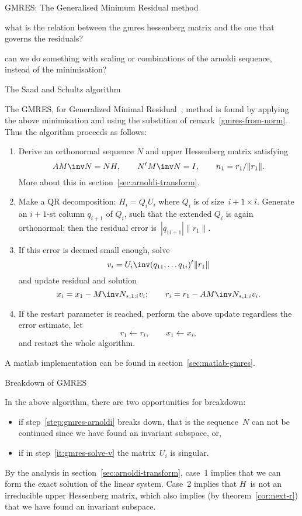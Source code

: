 \documentclass[11pt]{artikel3}
\begin{document}
\begin{Outline}

 {GMRES: The Generalised Minimum Residual method}
\label{sec:gmres}

\begin{question}
what is the relation between the gmres hessenberg matrix and the one
that governs the residuals?
\end{question}
\begin{question}
can we do something with scaling or combinations of the arnoldi
sequence, instead of the minimisation?
\end{question}

 {The Saad and Schultz algorithm}

The GMRES, for Generalized Minimal Residual~\cite{SaadSchultz:gmres}, method
is found by applying the above minimisation and using the
substition of remark~\ref{gmres-from-norm}.
Thus the algorithm proceeds as follows:
\begin{enumerate}
\item\label{step:gmres-arnoldi}
 Derive an orthonormal sequence $N$ and upper Hessenberg matrix satisfying
\[ AM\inv N=NH,\qquad N^tM\inv N=I,\qquad n_1=r_1/\|r_1\|. \]
More about this in section~\ref{sec:arnoldi-transform}.
\item\label{it:gmres-error}
Make a QR decomposition: $H_i=Q_iU_i$ where $Q_i$ is 
of size~\hbox{$i+1\times i$}.
Generate an $i+1$-st column $q_{i+1}$ of $Q_i$, such that
the extended $Q_i$ is again orthonormal;
then the residual error is~$|q_{1i+1}|\|r_1\|$.
\item\label{it:gmres-solve-v} If this error is deemed small enough, solve
\[ v_i=U_i\inv (q_{11},\ldots q_{1i})^t \|r_1\| \]
and update residual and solution
\[ x_i=x_1-M\inv N_{*,1:i}v_i; \qquad r_i=r_1-AM\inv N_{*,1:i}v_i. \]
\item If the restart parameter is reached, perform the above update
regardless the error estimate, let
\[ r_1\leftarrow r_i,\qquad x_1\leftarrow x_i, \]
and restart the whole algorithm.
\end{enumerate}

A matlab implementation can be found in section~\ref{sec:matlab-gmres}.

 {Breakdown of GMRES}\label{sec:gmres-breakdown}

In the above algorithm, there are two opportunities for breakdown:
\begin{itemize}\item if step~\ref{step:gmres-arnoldi}
breaks down, that is the sequence~$N$ can not be continued since we
have found an invariant subspace, or,
\item if in step~\ref{it:gmres-solve-v} the matrix~$U_i$ is singular.
\end{itemize}
By the analysis in section~\ref{sec:arnoldi-transform}, case~1
implies that we can form the exact solution of the linear system.
Case~2 implies that $H$~is not an irreducible upper Hessenberg matrix,
which also implies (by theorem~\ref{cor:next-r})
that we have found an invariant subspace.


\end{Outline}
\end{document}
